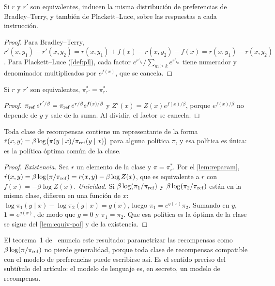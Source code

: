 \begin{lema}\label{lem:equiv-pref}
Si $r$ y $r'$ son equivalentes, inducen la misma distribución de preferencias de Bradley--Terry, y también de Plackett--Luce, sobre las respuestas a cada instrucción.
\end{lema}

\begin{proof}
Para Bradley--Terry, $r'(x,y_1)-r'(x,y_2)=r(x,y_1)+f(x)-r(x,y_2)-f(x)=r(x,y_1)-r(x,y_2)$. Para Plackett--Luce (\cref{def:pl}), cada factor $e^{r'_{i_k}}/\sum_{m\ge k}e^{r'_{i_m}}$ tiene numerador y denominador multiplicados por $e^{f(x)}$, que se cancela.
\end{proof}

\begin{lema}\label{lem:equiv-pol}
Si $r$ y $r'$ son equivalentes, $\pi_{r'}^{*}=\pi_r^{*}$.
\end{lema}

\begin{proof}
$\pi_{\mathrm{ref}}\,e^{r'/\beta}=\pi_{\mathrm{ref}}\,e^{r/\beta}e^{f(x)/\beta}$ y $Z'(x)=Z(x)e^{f(x)/\beta}$, porque $e^{f(x)/\beta}$ no depende de $y$ y sale de la suma. Al dividir, el factor se cancela.
\end{proof}

\begin{teorema}\label{teo:representacion}
Toda clase de recompensas contiene un representante de la forma $\hat r(x,y)=\beta\log\bigl(\pi(y\mid x)/\pi_{\mathrm{ref}}(y\mid x)\bigr)$ para alguna política $\pi$, y esa política es única: es la política óptima común de la clase.
\end{teorema}

\begin{proof}
\emph{Existencia.} Sea $r$ un elemento de la clase y $\pi=\pi_r^{*}$. Por el \cref{lem:reparam}, $\hat r(x,y)=\beta\log(\pi/\pi_{\mathrm{ref}})=r(x,y)-\beta\log Z(x)$, que es equivalente a $r$ con $f(x)=-\beta\log Z(x)$. \emph{Unicidad.} Si $\beta\log(\pi_1/\pi_{\mathrm{ref}})$ y $\beta\log(\pi_2/\pi_{\mathrm{ref}})$ están en la misma clase, difieren en una función de $x$: $\log\pi_1(y\mid x)-\log\pi_2(y\mid x)=g(x)$, luego $\pi_1=e^{g(x)}\pi_2$. Sumando en $y$, $1=e^{g(x)}$, de modo que $g=0$ y $\pi_1=\pi_2$. Que esa política es la óptima de la clase se sigue del \cref{lem:equiv-pol} y de la existencia.
\end{proof}

El teorema~1 de~\cite{dpo} enuncia este resultado: parametrizar las recompensas como $\beta\log(\pi/\pi_{\mathrm{ref}})$ no pierde generalidad, porque toda clase de recompensas compatible con el modelo de preferencias puede escribirse así. Es el sentido preciso del subtítulo del artículo: el modelo de lenguaje es, en secreto, un modelo de recompensa.

